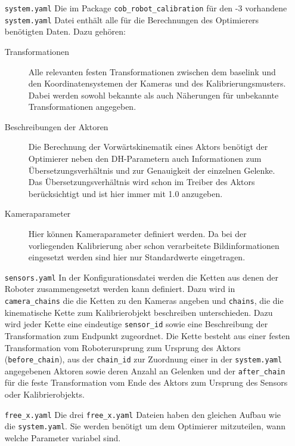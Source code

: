 \begin{itemize}

  \item[\texttt{system.yaml} ] Die im Package \texttt{cob\_robot\_calibration}
    für den -3 vorhandene \texttt{system.yaml} Datei enthält alle für die
    Berechnungen des Optimierers benötigten Daten. Dazu gehören:

    \begin{description}

      \item[Transformationen] Alle relevanten festen Transformationen zwischen
        dem \ac{baselink} und den Koordinatensystemen der Kameras und des
        Kalibrierungsmusters. Dabei werden sowohl bekannte als auch Näherungen
	für unbekannte Transformationen angegeben.

      \item[Beschreibungen der Aktoren] Die Berechnung der
        Vorwärtskinematik eines Aktors benötigt der Optimierer neben den
        \acl{DH-Parameter}n auch Informationen zum Übersetzungsverhältnis und
        zur Genauigkeit der einzelnen Gelenke. Das Übersetzungsverhältnis wird
        schon im Treiber des Aktors berücksichtigt und ist hier immer mit 1.0
        anzugeben.

      \item[Kameraparameter] Hier können Kameraparameter definiert werden. Da
        bei der vorliegenden Kalibrierung aber schon verarbeitete
        Bildinformationen eingesetzt werden sind hier nur Standardwerte
        eingetragen.

    \end{description}

  \item[\texttt{sensors.yaml}] In der Konfigurationsdatei werden die Ketten aus
    denen der Roboter zusammengesetzt werden kann definiert. Dazu wird in
    \texttt{camera\_chains} die die Ketten zu den Kameras angeben und 
    \texttt{chains}, die die kinematische Kette zum Kalibrierobjekt beschreiben
    unterschieden.
    Dazu wird jeder Kette eine eindeutige \texttt{sensor\_id} sowie eine
    Beschreibung der Transformation zum Endpunkt zugeordnet. Die Kette besteht
    aus einer festen Transformation vom Roboterursprung zum Ursprung des Aktors
    (\texttt{before\_chain}), aus der \texttt{chain\_id} zur Zuordnung einer in
    der \texttt{system.yaml} angegebenen Aktoren sowie deren Anzahl an Gelenken 
    und der \texttt{after\_chain} für die feste Transformation vom Ende des Aktors
    zum Ursprung des Sensors oder Kalibrierobjekts.

  \item[\texttt{free\_x.yaml}] Die drei \texttt{free\_x.yaml} Dateien haben den 
    gleichen Aufbau wie die \texttt{system.yaml}. Sie werden benötigt um dem 
    Optimierer mitzuteilen, wann welche Parameter variabel sind.
\end{itemize}


